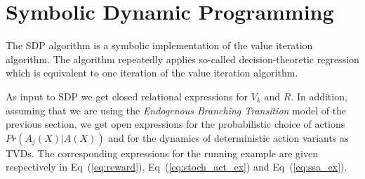 %

\section{Symbolic Dynamic Programming}

%
%
%
The SDP algorithm is a symbolic implementation of the value iteration algorithm. 
The algorithm repeatedly applies so-called decision-theoretic regression which is equivalent to one iteration of the value iteration algorithm. 

%

As input to SDP we get closed
relational expressions for $V_k$ and $R$.  In addition, assuming that we
are using the \emph{Endogenous Branching Transition} model of the
previous section, we get open expressions for the probabilistic choice
of actions $Pr(A_j(X)|A(X))$ and for the dynamics of deterministic
action variants as TVDs. The corresponding expressions for the running example are given respectively in 
Eq~(\ref{eq:reward}), 
Eq~(\ref{eq:stoch_act_ex}) and Eq~(\ref{eq:ssa_ex}).

